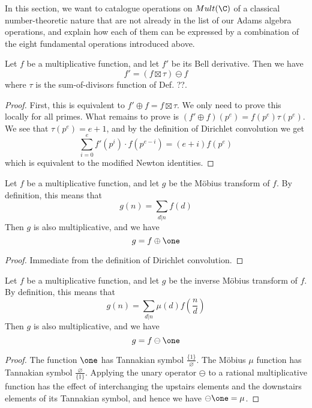 \documentclass[a4paper]{article}
\begin{document}
In this section, we want to catalogue operations on $Mult(\C)$ of a classical number-theoretic nature that are not already in the list of our Adams algebra operations, and explain how each of them can be expressed by a combination of the eight fundamental operations introduced above. 

\begin{theorem}
Let $f$ be a multiplicative function, and let $f'$ be its Bell derivative. Then we have
$$   f' = (f \boxtimes \tau) \ominus  f  $$  
where $\tau$ is the sum-of-divisors function of Def. ??.
\end{theorem}

\begin{proof}
First, this is equivalent to $f' \oplus f = f \boxtimes \tau$. We only need to prove this locally for all primes. What remains to prove is $(f' \oplus f)(p^e) = f(p^e) \tau(p^e)$. We see that $\tau(p^e) = e + 1$, and by the definition of Dirichlet convolution we get 
$$\sum_{i = 0}^e f'(p^i) \cdot f(p^{e - i}) = (e + i)f(p^e)$$
which is equivalent to the modified \todo{} Newton identities.
\end{proof}



\begin{propdef}
Let $f$ be a multiplicative function, and let $g$ be the M{\"o}bius transform of $f$. By definition, this means that
$$  g(n) = \sum_{d \vert n} f(d)  $$
Then $g$ is also multiplicative, and we have
$$  g = f \oplus \one   $$
\end{propdef}
\begin{proof}
Immediate from the definition of Dirichlet convolution.
\end{proof}

\begin{propdef}
Let $f$ be a multiplicative function, and let $g$ be the inverse M{\"o}bius transform of $f$. By definition, this means that
$$  g(n) = \sum_{d \vert n} \mu(d) f(\frac{n}{d})  $$
Then $g$ is also multiplicative, and we have
$$  g = f \ominus \one   $$
\end{propdef}
\begin{proof}
The function $\one$ has Tannakian symbol $\frac{ \{  1 \} }{ \varnothing }$. The M{\"o}bius $\mu$ function has Tannakian symbol $\frac{ \varnothing }{ \{  1 \} }$. Applying the unary operator $\ominus$ to a rational multiplicative function has the effect of interchanging the upstairs elements and the downstairs elements of its Tannakian symbol, and hence we have $\ominus \one = \mu$.
\end{proof}
\end{document}
